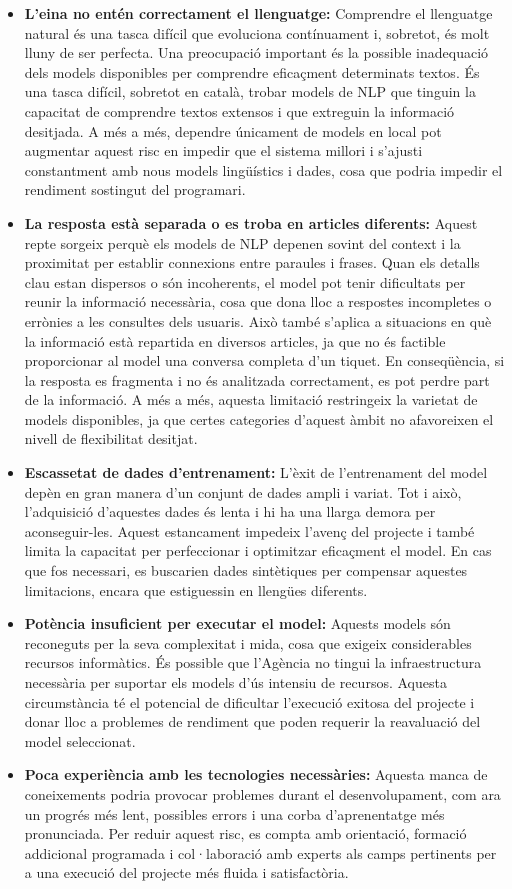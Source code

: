 \begin{itemize}
    \item \textbf{L'eina no entén correctament el llenguatge:} Comprendre el llenguatge natural és una tasca difícil que evoluciona contínuament i, sobretot, és molt lluny de ser perfecta. Una preocupació important és la possible inadequació dels models disponibles per comprendre eficaçment determinats textos. És una tasca difícil, sobretot en català, trobar models de NLP que tinguin la capacitat de comprendre textos extensos i que extreguin la informació desitjada. A més a més, dependre únicament de models en local pot augmentar aquest risc en impedir que el sistema millori i s'ajusti constantment amb nous models lingüístics i dades, cosa que podria impedir el rendiment sostingut del programari.
    \item \textbf{La resposta està separada o es troba en articles diferents:} Aquest repte sorgeix perquè els models de NLP depenen sovint del context i la proximitat per establir connexions entre paraules i frases. Quan els detalls clau estan dispersos o són incoherents, el model pot tenir dificultats per reunir la informació necessària, cosa que dona lloc a respostes incompletes o errònies a les consultes dels usuaris. Això també s'aplica a situacions en què la informació està repartida en diversos articles, ja que no és factible proporcionar al model una conversa completa d'un tiquet. En conseqüència, si la resposta es fragmenta i no és analitzada correctament, es pot perdre part de la informació. A més a més, aquesta limitació restringeix la varietat de models disponibles, ja que certes categories d'aquest àmbit no afavoreixen el nivell de flexibilitat desitjat.
    \item \textbf{Escassetat de dades d'entrenament:} L'èxit de l'entrenament del model depèn en gran manera d'un conjunt de dades ampli i variat. Tot i això, l'adquisició d'aquestes dades és lenta i hi ha una llarga demora per aconseguir-les. Aquest estancament impedeix l'avenç del projecte i també limita la capacitat per perfeccionar i optimitzar eficaçment el model. En cas que fos necessari, es buscarien dades sintètiques per compensar aquestes limitacions, encara que estiguessin en llengües diferents.
    \item \textbf{Potència insuficient per executar el model:} Aquests models són reconeguts per la seva complexitat i mida, cosa que exigeix considerables recursos informàtics. És possible que l'Agència no tingui la infraestructura necessària per suportar els models d'ús intensiu de recursos. Aquesta circumstància té el potencial de dificultar l'execució exitosa del projecte i donar lloc a problemes de rendiment que poden requerir la reavaluació del model seleccionat.
    \item \textbf{Poca experiència amb les tecnologies necessàries:} Aquesta manca de coneixements podria provocar problemes durant el desenvolupament, com ara un progrés més lent, possibles errors i una corba d'aprenentatge més pronunciada. Per reduir aquest risc, es compta amb orientació, formació addicional programada i col·laboració amb experts als camps pertinents per a una execució del projecte més fluida i satisfactòria.
\end{itemize}
